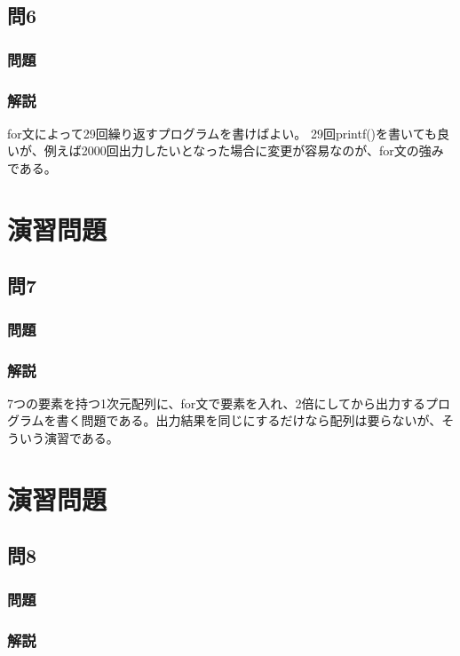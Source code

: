 \subsection{問6}
\subsubsection{問題}

\subsubsection{解説}

for文によって29回繰り返すプログラムを書けばよい。
29回printf()を書いても良いが、例えば2000回出力したいとなった場合に変更が容易なのが、for文の強みである。

\section{演習問題}
\subsection{問7}
\subsubsection{問題}

\subsubsection{解説}

7つの要素を持つ1次元配列に、for文で要素を入れ、2倍にしてから出力するプログラムを書く問題である。出力結果を同じにするだけなら配列は要らないが、そういう演習である。

\section{演習問題}
\subsection{問8}
\subsubsection{問題}

\subsubsection{解説}

